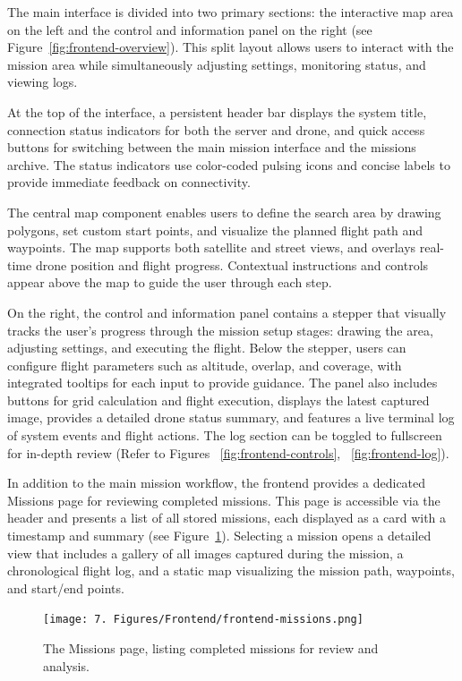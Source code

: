 The main interface is divided into two primary sections: the interactive map area on the left and the control and information panel on the right (see Figure~\ref{fig:frontend-overview}). This split layout allows users to interact with the mission area while simultaneously adjusting settings, monitoring status, and viewing logs.

At the top of the interface, a persistent header bar displays the system title, connection status indicators for both the server and drone, and quick access buttons for switching between the main mission interface and the missions archive. The status indicators use color-coded pulsing icons and concise labels to provide immediate feedback on connectivity.

The central map component enables users to define the search area by drawing polygons, set custom start points, and visualize the planned flight path and waypoints. The map supports both satellite and street views, and overlays real-time drone position and flight progress. Contextual instructions and controls appear above the map to guide the user through each step.

On the right, the control and information panel contains a stepper that visually tracks the user's progress through the mission setup stages: drawing the area, adjusting settings, and executing the flight. Below the stepper, users can configure flight parameters such as altitude, overlap, and coverage, with integrated tooltips for each input to provide guidance. The panel also includes buttons for grid calculation and flight execution, displays the latest captured image, provides a detailed drone status summary, and features a live terminal log of system events and flight actions. The log section can be toggled to fullscreen for in-depth review (Refer to Figures ~\ref{fig:frontend-controls}, ~\ref{fig:frontend-log}).


In addition to the main mission workflow, the frontend provides a dedicated Missions page for reviewing completed missions. This page is accessible via the header and presents a list of all stored missions, each displayed as a card with a timestamp and summary (see Figure~\ref{fig:frontend-missions}). Selecting a mission opens a detailed view that includes a gallery of all images captured during the mission, a chronological flight log, and a static map visualizing the mission path, waypoints, and start/end points.

\begin{figure}[H]
    \centering
    \texttt{[image: 7. Figures/Frontend/frontend-missions.png]}
    \caption{The Missions page, listing completed missions for review and analysis.}
    \label{fig:frontend-missions}
\end{figure}

